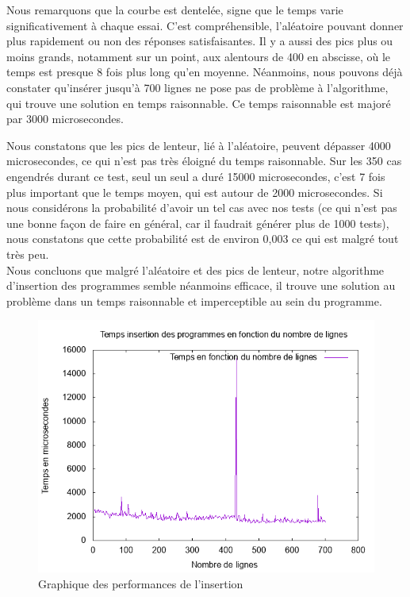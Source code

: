 \documentclass[hidelinks]{report}
\begin{document}
Nous remarquons que la courbe est dentelée, signe que le temps varie significativement à chaque essai. C'est compréhensible, l'aléatoire pouvant donner plus rapidement ou non des réponses satisfaisantes. Il y a aussi des pics plus ou moins grands, notamment sur un point, aux alentours de 400 en abscisse, où le temps est presque 8 fois plus long qu'en moyenne. Néanmoins, nous pouvons déjà constater qu'insérer jusqu'à 700 lignes ne pose pas de problème à l'algorithme, qui trouve une solution en temps raisonnable. Ce temps raisonnable est majoré par 3000 microsecondes. 

Nous constatons que les pics de lenteur, lié à l'aléatoire, peuvent dépasser 4000 microsecondes, ce qui n'est pas très éloigné du temps raisonnable. Sur les 350 cas engendrés durant ce test, seul un seul a duré 15000 microsecondes, c'est 7 fois plus important que le temps moyen, qui est autour de 2000 microsecondes. Si nous considérons la probabilité d'avoir un tel cas avec nos tests (ce qui n'est pas une bonne façon de faire en général, car il faudrait générer plus de 1000 tests), nous constatons que cette probabilité est de environ 0,003 ce qui est malgré tout très peu.
\\

Nous concluons que malgré l'aléatoire et des pics de lenteur, notre algorithme d'insertion des programmes semble néanmoins efficace, il trouve une solution au problème dans un temps raisonnable et imperceptible au sein du programme.
\begin{figure}
    \centering
    \includegraphics[scale=0.8]{images/graphiques/writePerf.png}
    \caption{Graphique des performances de l'insertion}
    \label{fig:perfInsert}
\end{figure}
\end{document}
